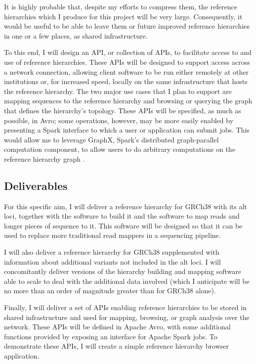 \documentclass[11pt,proposal]{ucthesis}
\begin{document}
It is highly probable that, despite my efforts to compress them, the reference hierarchies which I produce for this project will be very large. Consequently, it would be useful to be able to leave them or future improved reference hierarchies in one or a few places, as shared infrastructure.

To this end, I will design an API, or collection of APIs, to facilitate access to and use of reference hierarchies. These APIs will be designed to support access across a network connection, allowing client software to be run either remotely at other institutions or, for increased speed, locally on the same infrastructure that hosts the reference hierarchy. The two major use cases that I plan to support are mapping sequences to the reference hierarchy and browsing or querying the graph that defines the hierarchy's topology. These APIs will be specified, as much as possible, in Avro; some operations, however, may be more easily enabled by presenting a Spark interface to which a user or application can submit jobs. This would allow me to leverage GraphX, Spark's distributed graph-parallel computation component, to allow users to do arbitrary computations on the reference hierarchy graph \cite{xin2013graphx}.

\subsection{Deliverables} 
\label{subsec:aim2deliverables}

For this specific aim, I will deliver a reference hierarchy for GRCh38 with its alt loci, together with the software to build it and the software to map reads and longer pieces of sequence to it. This software will be designed so that it can be used to replace more traditional read mappers in a sequencing pipeline.

I will also deliver a reference hierarchy for GRCh38 supplemented with information about additional variants not included in the alt loci. I will concomitantly deliver versions of the hierarchy building and mapping software able to scale to deal with the additional data involved (which I anticipate will be no more than an order of magnitude greater than for GRCh38 alone).

Finally, I will deliver a set of APIs enabling reference hierarchies to be stored in shared infrastructure and used for mapping, browsing, or graph analysis over the network. These APIs will be defined in Apache Avro, with some additional functions provided by exposing an interface for Apache Spark jobs. To demonstrate these APIs, I will create a simple reference hierarchy browser application.
\end{document}
